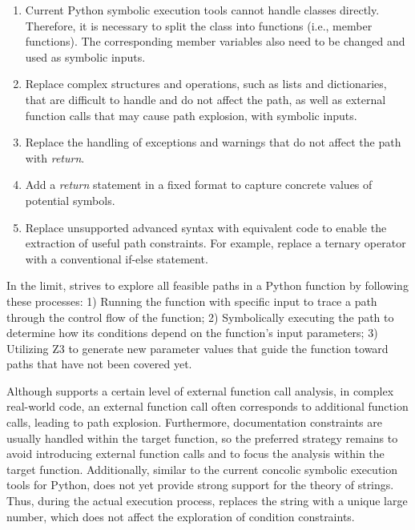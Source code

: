 \begin{enumerate}
    \item Current Python symbolic execution tools cannot handle classes directly. Therefore, it is necessary to split the class into functions (i.e., member functions). The corresponding member variables also need to be changed and used as symbolic inputs.
    \item Replace complex structures and operations, such as lists and dictionaries, that are difficult to handle and do not affect the path, as well as external function calls that may cause path explosion, with symbolic inputs.
    \item Replace the handling of exceptions and warnings that do not affect the path with \textit{return}.
    \item Add a \textit{return} statement in a fixed format to capture concrete values of potential symbols.
    \item Replace unsupported advanced syntax with equivalent code to enable the extraction of useful path constraints. For example, replace a ternary operator with a conventional if-else statement.
\end{enumerate}


In the limit, \toolchecker strives to explore all feasible paths in a Python function by following these processes: 1) Running the function with specific input to trace a path through the control flow of the function; 2) Symbolically executing the path to determine how its conditions depend on the function's input parameters; 3) Utilizing Z3 to generate new parameter values that guide the function toward paths that have not been covered yet.

Although \toolchecker supports a certain level of external function call analysis, in complex real-world code, an external function call often corresponds to additional function calls, leading to path explosion. Furthermore, documentation constraints are usually handled within the target function, so the preferred strategy remains to avoid introducing external function calls and to focus the analysis within the target function. Additionally, similar to the current concolic symbolic execution tools for Python, \toolchecker does not yet provide strong support for the theory of strings. Thus, during the actual execution process, \toolchecker replaces the string with a unique large number, which does not affect the exploration of condition constraints.


